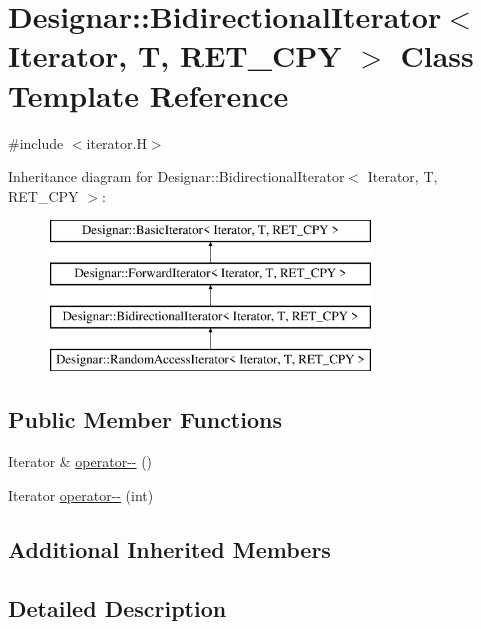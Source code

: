 \hypertarget{class_designar_1_1_bidirectional_iterator}{}\section{Designar\+:\+:Bidirectional\+Iterator$<$ Iterator, T, R\+E\+T\+\_\+\+C\+PY $>$ Class Template Reference}
\label{class_designar_1_1_bidirectional_iterator}


{\ttfamily \#include $<$iterator.\+H$>$}

Inheritance diagram for Designar\+:\+:Bidirectional\+Iterator$<$ Iterator, T, R\+E\+T\+\_\+\+C\+PY $>$\+:\begin{figure}[H]
\begin{center}
\leavevmode
\includegraphics[height=4.000000cm]{class_designar_1_1_bidirectional_iterator}
\end{center}
\end{figure}
\subsection*{Public Member Functions}
\begin{DoxyCompactItemize}
\item 
Iterator \& \hyperlink{class_designar_1_1_bidirectional_iterator_aac9847e9868e270c4266a6fa0323a6ef}{operator-\/-\/} ()
\item 
Iterator \hyperlink{class_designar_1_1_bidirectional_iterator_a71602759debbdd18c89ffddb2217acb3}{operator-\/-\/} (int)
\end{DoxyCompactItemize}
\subsection*{Additional Inherited Members}


\subsection{Detailed Description}
